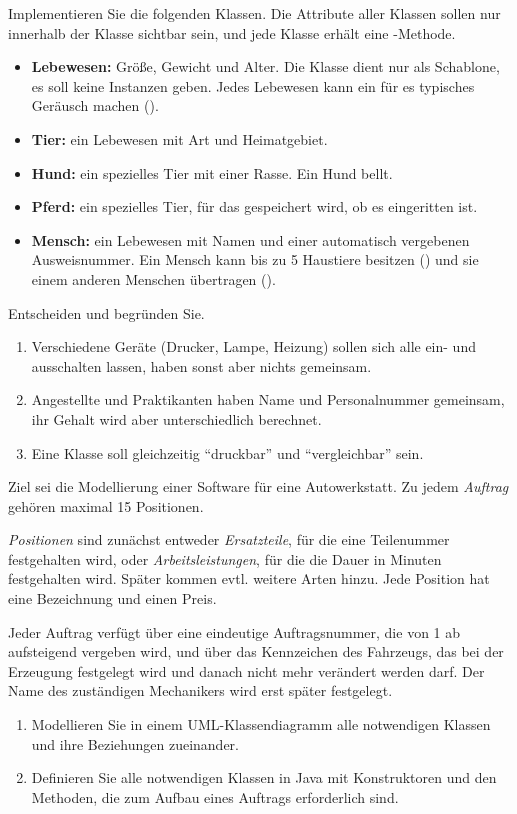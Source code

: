 Implementieren Sie die folgenden Klassen. Die Attribute aller Klassen sollen nur innerhalb der Klasse sichtbar sein, und jede Klasse erhält eine -Methode.
\begin{itemize}[itemsep=0.1em]
\item \textbf{Lebewesen:} Größe, Gewicht und Alter. Die Klasse dient nur als Schablone, es soll keine Instanzen geben. Jedes Lebewesen kann ein für es typisches Geräusch machen ().
\item \textbf{Tier:} ein Lebewesen mit Art und Heimatgebiet.
\item \textbf{Hund:} ein spezielles Tier mit einer Rasse. Ein Hund bellt.
\item \textbf{Pferd:} ein spezielles Tier, für das gespeichert wird, ob es eingeritten ist.
\item \textbf{Mensch:} ein Lebewesen mit Namen und einer automatisch vergebenen Ausweisnummer. Ein Mensch kann bis zu 5 Haustiere besitzen () und sie einem anderen Menschen übertragen ().
\end{itemize}

Entscheiden und begründen Sie.
\begin{enumerate}[label=\alph*)]
\item Verschiedene Geräte (Drucker, Lampe, Heizung) sollen sich alle ein- und ausschalten lassen, haben sonst aber nichts gemeinsam.
\item Angestellte und Praktikanten haben Name und Personalnummer gemeinsam, ihr Gehalt wird aber unterschiedlich berechnet.
\item Eine Klasse soll gleichzeitig \enquote{druckbar} und \enquote{vergleichbar} sein.
\end{enumerate}

Ziel sei die Modellierung einer Software für eine Autowerkstatt. Zu jedem \emph{Auftrag} gehören maximal 15 Positionen.

\emph{Positionen} sind zunächst entweder \emph{Ersatzteile}, für die eine Teilenummer festgehalten wird, oder \emph{Arbeitsleistungen}, für die die Dauer in Minuten festgehalten wird. Später kommen evtl. weitere Arten hinzu. Jede Position hat eine Bezeichnung und einen Preis.

Jeder Auftrag verfügt über eine eindeutige Auftragsnummer, die von 1 ab aufsteigend vergeben wird, und über das Kennzeichen des Fahrzeugs, das bei der Erzeugung festgelegt wird und danach nicht mehr verändert werden darf. Der Name des zuständigen Mechanikers wird erst später festgelegt.
\begin{enumerate}[label=\alph*)]
\item Modellieren Sie in einem UML-Klassendiagramm alle notwendigen Klassen und ihre Beziehungen zueinander.
\item Definieren Sie alle notwendigen Klassen in Java mit Konstruktoren und den Methoden, die zum Aufbau eines Auftrags erforderlich sind.
\end{enumerate}
